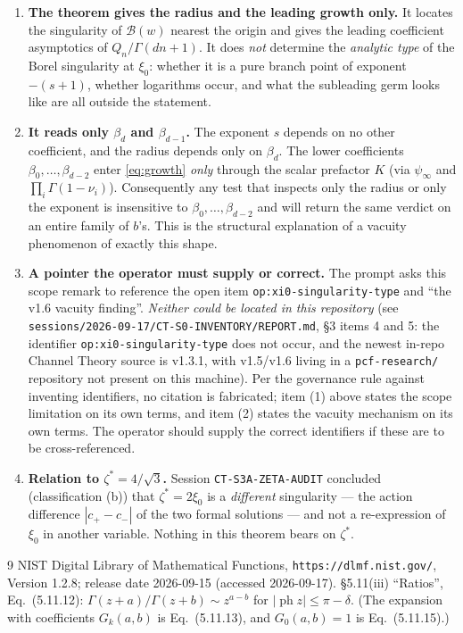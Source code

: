 \documentclass[11pt]{article}
\theoremstyle{definition}
\newcommand{\bd}{\beta_d}
\newcommand{\bdm}{\beta_{d-1}}
\newcommand{\psiinf}{\psi_\infty}
\begin{document}
\begin{enumerate}
\item \textbf{The theorem gives the radius and the leading growth only.} It
locates the singularity of $\mathcal{B}(w)$ nearest the origin and gives the
leading coefficient asymptotics of $Q_n/\Gamma(dn+1)$. It does \emph{not}
determine the \emph{analytic type} of the Borel singularity at $\xi_0$: whether
it is a pure branch point of exponent $-(s+1)$, whether logarithms occur, and
what the subleading germ looks like are all outside the statement.
\item \textbf{It reads only $\bd$ and $\bdm$.} The exponent $s$ depends on no
other coefficient, and the radius depends only on $\bd$. The lower coefficients
$\beta_0,\dots,\beta_{d-2}$ enter \eqref{eq:growth} \emph{only} through the
scalar prefactor $K$ (via $\psiinf$ and $\prod_i\Gamma(1-\nu_i)$). Consequently any
test that inspects only the radius or only the exponent is insensitive to
$\beta_0,\dots,\beta_{d-2}$ and will return the same verdict on an entire family
of $b$'s. This is the structural explanation of a vacuity phenomenon of exactly
this shape.
\item \textbf{A pointer the operator must supply or correct.} The prompt asks
this scope remark to reference the open item \texttt{op:xi0-singularity-type}
and ``the v1.6 vacuity finding''. \emph{Neither could be located in this
repository} (see \texttt{sessions/2026-09-17/CT-S0-INVENTORY/REPORT.md}, \S3
items 4 and 5: the identifier \texttt{op:xi0-singularity-type} does not occur,
and the newest in-repo Channel Theory source is v1.3.1, with v1.5/v1.6 living in
a \texttt{pcf-research/} repository not present on this machine). Per the
governance rule against inventing identifiers, no citation is fabricated; item
(1) above states the scope limitation on its own terms, and item (2) states the
vacuity mechanism on its own terms. The operator should supply the correct
identifiers if these are to be cross-referenced.
\item \textbf{Relation to $\zeta^*=4/\sqrt3$.} Session
\texttt{CT-S3A-ZETA-AUDIT} concluded (classification (b)) that $\zeta^*=2\xi_0$
is a \emph{different} singularity --- the action difference $|c_+-c_-|$ of the
two formal solutions --- and not a re-expression of $\xi_0$ in another variable.
Nothing in this theorem bears on $\zeta^*$.
\end{enumerate}

\begin{thebibliography}{9}
NIST Digital Library of Mathematical Functions, \texttt{https://dlmf.nist.gov/},
Version 1.2.8; release date 2026-09-15 (accessed 2026-09-17).
\S5.11(iii) ``Ratios'', Eq.~(5.11.12):
$\Gamma(z+a)/\Gamma(z+b)\sim z^{a-b}$ for
$|\operatorname{ph}z|\le\pi-\delta$. (The expansion with coefficients
$G_k(a,b)$ is Eq.~(5.11.13), and $G_0(a,b)=1$ is Eq.~(5.11.15).)
\end{thebibliography}
\end{document}
